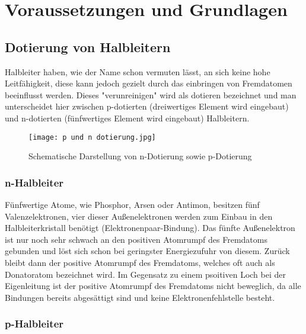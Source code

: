 \documentclass[12pt, a4paper]{article}
\begin{document}
\section{Voraussetzungen und Grundlagen}

\subsection{Dotierung von Halbleitern}

Halbleiter haben, wie der Name schon vermuten lässt, an sich keine hohe Leitfähigkeit, diese kann jedoch gezielt durch das einbringen von Fremdatomen beeinflusst werden. Dieses "verunreinigen" wird als dotieren bezeichnet und man unterscheidet hier zwischen p-dotierten (dreiwertiges Element wird eingebaut) und n-dotierten (fünfwertiges Element wird eingebaut) Halbleitern.

\begin{figure}[!htpb]
    \centering
    \texttt{[image: p und n dotierung.jpg]}
    \caption[Schematische Darstellung von n-Dotierung sowie p-Dotierung]
            {Schematische Darstellung von n-Dotierung sowie p-Dotierung}
    \label{fig:pnhalbleiter}
\end{figure}
\FloatBarrier

\subsubsection{n-Halbleiter}

Fünfwertige Atome, wie Phosphor, Arsen oder Antimon, besitzen fünf Valenzelektronen, vier dieser Außenelektronen werden zum Einbau in den Halbleiterkristall benötigt (Elektronenpaar-Bindung). Das fünfte Außenelektron ist nur noch sehr schwach an den positiven Atomrumpf des Fremdatoms gebunden und löst sich schon bei geringster Energiezufuhr von diesem. Zurück bleibt dann der positive Atomrumpf des Fremdatoms, welches oft auch als Donatoratom bezeichnet wird. Im Gegensatz zu einem psoitiven Loch bei der Eigenleitung ist der positive Atomrumpf des Fremdatoms nicht beweglich, da alle Bindungen bereits abgesättigt sind und keine Elektronenfehlstelle besteht.

\subsubsection{p-Halbleiter}
\end{document}
